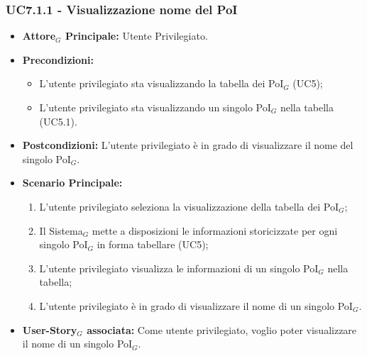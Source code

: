 \documentclass[10pt]{article}
\begin{document}
\begin{justify}
\subsubsection{\textbf{UC7.1.1 - Visualizzazione nome del PoI}}
\label{UC7.1.1}
\begin{itemize}
    \item \textbf{Attore$_G$ Principale:} Utente Privilegiato.
    \item \textbf{Precondizioni:} 
        \begin{itemize}
          \item L'utente privilegiato sta visualizzando la tabella dei PoI$_G$ (UC5);
            \item L'utente privilegiato sta visualizzando un singolo PoI$_G$ nella tabella (UC5.1).
        \end{itemize}
      \item \textbf{Postcondizioni:} L'utente privilegiato è in grado di visualizzare il nome del singolo PoI$_G$.
    \item \textbf{Scenario Principale:} 
        \begin{enumerate}
        \item L'utente privilegiato seleziona la visualizzazione della tabella dei PoI$_G$;
          \item Il Sistema$_G$ mette a disposizioni le informazioni storicizzate per ogni singolo PoI$_G$ in forma tabellare (UC5);
          \item L'utente privilegiato visualizza le informazioni di un singolo PoI$_G$ nella tabella;
            \item L'utente privilegiato è in grado di visualizzare il nome di un singolo PoI$_G$.
        \end{enumerate}
    \item \textbf{User-Story$_G$ associata:} Come utente privilegiato, voglio poter visualizzare il nome di un singolo PoI$_G$.
\end{itemize}


\end{justify}
\end{document}
